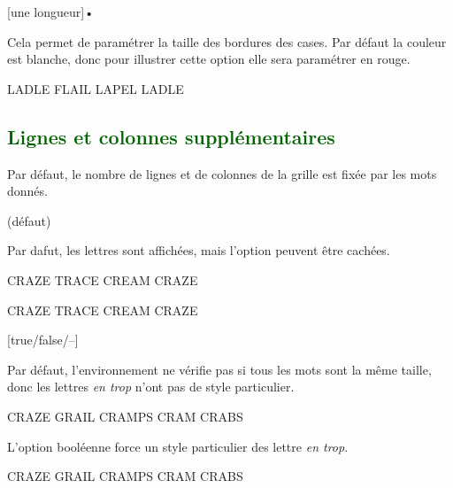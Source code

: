 \documentclass[svgnames]{report}
\newcommand\Section[1]{\subsection{\textcolor{DarkGreen}{#1}}}
\begin{document}
  [une longueur]•

  Cela permet de paramétrer la taille des bordures des cases. Par défaut la couleur est blanche, donc pour illustrer cette option elle sera paramétrer en rouge.

  \begin{example}
  \begin{GrilleSutom}[Epaisseur=0.75mm,CouleurBordures=red]{LADLE}
     FLAIL
     LAPEL
     LADLE
  \end{GrilleSutom}
  \end{example}

  \Section{Lignes et colonnes supplémentaires}

  Par défaut, le nombre de lignes et de colonnes de la grille est fixée par les mots donnés.

   (défaut)\qquad

  Par dafut, les lettres sont affichées, mais l'option  peuvent être cachées.

  \begin{example}
  \begin{GrilleSutom}{CRAZE} %
    TRACE
    CREAM
    CRAZE
  \end{GrilleSutom}
  \end{example}

  \begin{example}
  \begin{GrilleSutom}[NonLettres]{CRAZE}
    TRACE
    CREAM
    CRAZE
  \end{GrilleSutom}
  \end{example}

  [true/false/--]

  Par défaut, l'environnement ne vérifie pas si tous les mots sont la même taille, donc les lettres \textit{en trop} n'ont pas de style particulier.

  \begin{example}
  \begin{GrilleSutom}[Strict=false]{CRAZE} %
    GRAIL
    CRAMPS
    CRAM
    CRABS
  \end{GrilleSutom}
  \end{example}

  L'option booléenne  force un style particulier des lettre \textit{en trop}.

  \begin{example}
  \begin{GrilleSutom}[Strict]{CRAZE}
    GRAIL
    CRAMPS
    CRAM
    CRABS
  \end{GrilleSutom}
  \end{example}
\end{document}
